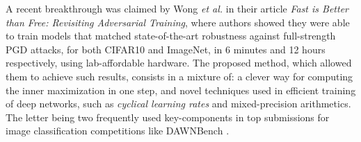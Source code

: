 \documentclass[LaM,binding=0.6cm]{./packages/sapthesis/sapthesis}
\begin{document}
        A recent breakthrough was claimed by Wong \textit{et al.} in their article \textit{Fast is Better than Free: Revisiting Adversarial Training}\cite{fast_adv_train},
        where authors showed they were able to train models that matched state-of-the-art robustness against full-strength PGD attacks, for both CIFAR10
        and ImageNet, in 6 minutes and 12 hours respectively, using lab-affordable hardware. The proposed method, which allowed them to achieve such results, consists in a mixture of: 
        a clever way for computing the inner maximization in one step, and novel techniques used in efficient 
        training of deep networks, such as \textit{cyclical learning rates} \cite{smith2017cyclical} and mixed-precision arithmetics. The letter being 
        two frequently used key-components in top submissions for image classification competitions like DAWNBench \cite{dawnbench}.
        
\end{document}
